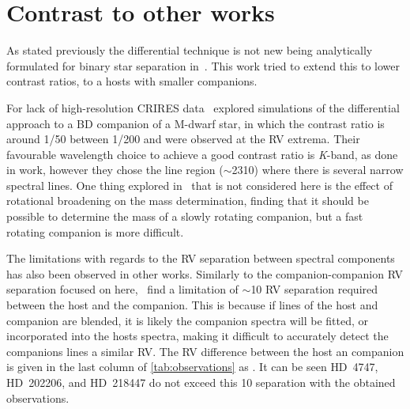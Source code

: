 
\section{Contrast to other works}

As stated previously the differential technique is not new being analytically formulated for binary star separation in~\citet{ferluga_separating_1997}.
This work tried to extend this to lower contrast ratios, to a hosts with smaller companions.

For lack of high-resolution CRIRES data~\citet{kostogryz_spectral_2013} explored simulations of the differential approach to a {BD} companion of a {M-dwarf} star, in which the contrast ratio is around 1/50 between 1/200 and were observed at the {RV} extrema.
Their favourable wavelength choice to achieve a good contrast ratio is \emph{K}-band, as done in work, however they chose the  line region (\(\sim\)2310\nm{}) where there is several narrow spectral lines.
One thing explored in~\citet{kostogryz_spectral_2013} that is not considered here is the effect of rotational broadening on the mass determination, finding that it should be possible to determine the mass of a slowly rotating companion, but a fast rotating companion is more difficult.

The limitations with regards to the {RV} separation between spectral components has also been observed in other works.
Similarly to the companion-companion {RV} separation focused on here,~\citet{kolbl_detection_2015} find a limitation of \(\sim\)10\kmps{} {RV} separation required between the host and the companion.
This is because if lines of the host and companion are blended, it is likely the companion spectra will be fitted, or incorporated into the hosts spectra, making it difficult to accurately detect the companions lines a similar {RV}.
The {RV} difference between the host an companion is given in the last column of \cref{tab:observations} as \Rvtwo{}.
It can be seen {HD~4747}, {HD~202206}, and {HD~218447} do not exceed this 10\kmps{} separation with the obtained observations.

